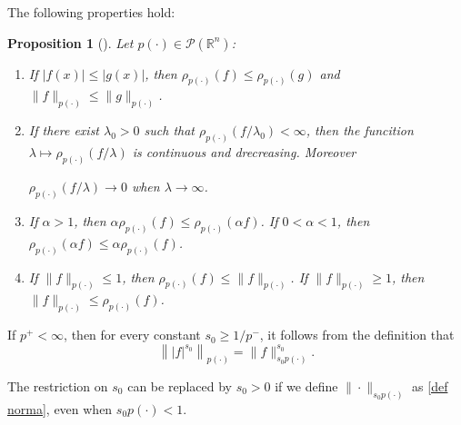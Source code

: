 \documentclass[a4paper,11pt,reqno]{amsart}
\theoremstyle{plain}
\numberwithin{equation}{section}
\newtheorem{propo}[teo]{Proposition}
\theoremstyle{definition}
\newcommand{\R}{{\mathbb{R}^n}}
\begin{document}
The following properties hold:
\begin{propo}[\cite{libro Diening,libro CU-FIO}]\label{propo modular} Let $p(\cdot)\in \mathcal{P}(\R)$:
	\begin{enumerate}
		\item If $|f(x)|\leq|g(x)|$, then $\rho_{p(\cdot)}(f)\leq \rho_{p(\cdot)}(g)$ and $\|f\|_{p(\cdot)}\leq\|g\|_{p(\cdot)}$.
		\item If there exist $\lambda_0>0$ such that $\rho_{p(\cdot)}(f/\lambda_0)<\infty$, then the funcition $\lambda\longmapsto\rho_{p(\cdot)}(f/\lambda)$ is continuous and drecreasing. Moreover 
		
		$\rho_{p(\cdot)}(f/\lambda)\to 0$ when $\lambda\to\infty$.
		\item If $\alpha>1$, then $\alpha\rho_{p(\cdot)}(f)\leq \rho_{p(\cdot)}(\alpha f)$. If $0<\alpha<1$, then $\rho_{p(\cdot)}(\alpha f)\leq \alpha\rho_{p(\cdot)}(f)$.
		\item If $\|f\|_{p(\cdot)}\leq 1$, then $\rho_{p(\cdot)}(f)\leq \|f\|_{p(\cdot)}$. If $\|f\|_{p(\cdot)}\geq 1$, then $\|f\|_{p(\cdot)}\leq\rho_{p(\cdot)}(f)$.
	\end{enumerate}
\end{propo}
If $p^+<\infty$, then for every constant $s_0\geq1/p^-$, it follows from the definition that
\begin{equation}\label{exponente en la norma}
	\left\||f|^{s_0}\right\|_{p(\cdot)}=\|f\|^{s_0}_{s_0p(\cdot)}.
\end{equation}

The restriction on $s_0$ can be replaced by $s_0 > 0$ if we define $\|\cdot\|_{s_0 p(\cdot)}$ as \eqref{def norma}, even when $s_0 p(\cdot) < 1$.
\end{document}
